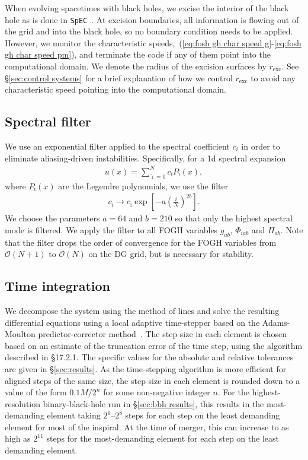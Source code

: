 \begin{bibunit}[unsrtnat]
When evolving spacetimes with black holes, we excise the interior of the black
hole as is done in \texttt{SpEC}~\cite{Lindblom:2005qh}. At excision boundaries,
all information is flowing out of the grid and into the black hole, so no
boundary condition needs to be applied. However, we monitor the characteristic
speeds,~(\ref{eq:fosh gh char speed g}-\ref{eq:fosh gh char speed pm}),
and terminate the code if any of them point into the computational domain. We
denote the radius of the excision surfaces by $r_{\mathrm{exc}}$. See 
\S\ref{sec:control systems} for a brief explanation of how we control
$r_{\mathrm{exc}}$ to avoid any characteristic speed pointing into the
computational domain.

\subsection{Spectral filter\label{sec:gh spectral filter}}
We use an exponential filter applied to the spectral coefficient $c_i$ in order
to eliminate aliasing-driven instabilities. Specifically, for a 1d spectral
expansion
\begin{eqnarray}
  \label{eq:u spectral expansion}
  u(x)=\sum_{\breve{\imath}=0}^{N}c_{\breve{\imath}} P_{\breve{\imath}}(x),
\end{eqnarray}
where $P_{\breve{\imath}}(x)$ are the Legendre polynomials, we use the filter
\begin{eqnarray}
  \label{eq:exponential filter}
  c_{\breve{\imath}} \to c_{\breve{\imath}}
  \exp\left[-a\left(\frac{i}{N}\right)^{2b}\right].
\end{eqnarray}
We choose the parameters $a=64$ and $b=210$ so that only the highest
spectral mode is filtered. We apply the filter to all FOGH variables $g_{ab}$,
$\Phi_{iab}$ and $\Pi_{ab}$. Note that the filter drops the order of convergence
for the FOGH variables from $\mathcal{O}(N+1)$ to $\mathcal{O}(N)$ on the DG
grid, but is necessary for stability.

\subsection{Time integration\label{sec:time integration}}
We decompose the system using the method of lines and solve the resulting
differential equations using a local adaptive time-stepper based on the
Adams-Moulton predictor-corrector method~\cite{ThroweLTSAM}.  The
step size in each element is chosen based on an estimate of the truncation error
of the time step, using the algorithm described in \cite{NumericalRecipes}
\S17.2.1. The specific values for the absolute and relative tolerances are
given in \S\ref{sec:results}. As the time-stepping algorithm
is more efficient for aligned steps of the same size, the step size in each
element is rounded down to a value of the form $0.1 M / 2^n$ for some
non-negative integer $n$.  For the highest-resolution binary-black-hole run in
\S\ref{sec:bbh results}, 
this results in the most-demanding element taking $2^6$--$2^8$ steps for each
step on the least demanding element for most of the inspiral. At the time of
merger, this can increase to as high as $2^{11}$ steps for the most-demanding
element for each step on the least demanding element.


\end{bibunit}
